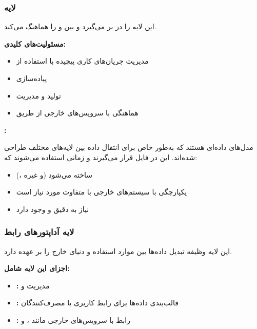 \subsubsection{لایه }

این لایه  را در بر می‌گیرد و  بین  و  را هماهنگ می‌کند.

\noindent
\textbf{مسئولیت‌های کلیدی:}
\begin{itemize}
    \item مدیریت جریان‌های کاری پیچیده با استفاده از 
    \item پیاده‌سازی 
    \item تولید و مدیریت 
    \item هماهنگی با سرویس‌های خارجی از طریق 
\end{itemize}

\noindent
\textbf{:}

 مدل‌های داده‌ای هستند که به‌طور خاص برای انتقال داده بین لایه‌های مختلف طراحی شده‌اند. این  در فایل  قرار می‌گیرند و زمانی استفاده می‌شوند که:
\begin{itemize}
    \item {} (،  و غیره) ساخته می‌شود
    \item یکپارچگی با سیستم‌های خارجی با  متفاوت مورد نیاز است
    \item نیاز به  دقیق و  وجود دارد
\end{itemize}

\subsubsection{لایه آداپتورهای رابط }

این لایه وظیفه تبدیل داده‌ها بین موارد استفاده و دنیای خارج را بر عهده دارد.

\noindent
\textbf{اجزای این لایه شامل:}
\begin{itemize}
    \item \textbf{:} مدیریت  و 
    \item \textbf{:} قالب‌بندی داده‌ها برای رابط کاربری یا مصرف‌کنندگان 
    \item \textbf{:} رابط با سرویس‌های خارجی مانند ،  و 
\end{itemize}

